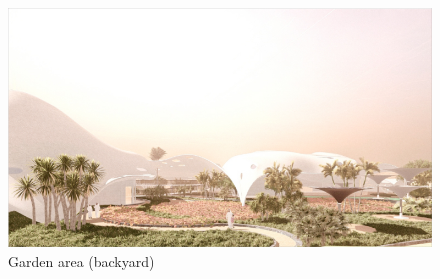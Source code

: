 \begin{figure}[H]
	\centering
	\includegraphics[width=\linewidth]{src/graphics/riyadh-dream-villas--perspective-04.jpg}
	\caption*{%
		Garden area (backyard)%
	}
	\label{
		fig:riyadh-dream-villas--perspective-04
	}
\end{figure}
